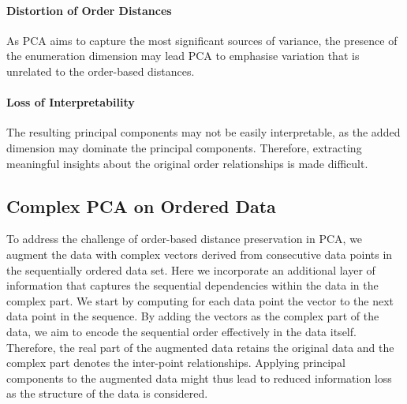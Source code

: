 \documentclass[pdftex,12pt,a4paper]{report}
\begin{document}
\paragraph{Distortion of Order Distances}
As PCA aims to capture the most significant sources of variance, the presence of the enumeration dimension may lead PCA to emphasise variation that is unrelated to the order-based distances.
\paragraph{Loss of Interpretability}
The resulting principal components may not be easily interpretable, as the added dimension may dominate the principal components.
Therefore, extracting meaningful insights about the original order relationships is made difficult.


\subsection{Complex PCA on Ordered Data} \label{CPCA}
To address the challenge of order-based distance preservation in PCA, we augment the data with complex vectors derived from consecutive data points in the sequentially ordered data set.
Here we incorporate an additional layer of information that captures the sequential dependencies within the data in the complex part.
We start by computing for each data point the vector to the next data point in the sequence.
By adding the vectors as the complex part of the data, we aim to encode the sequential order effectively in the data itself.
Therefore, the real part of the augmented data retains the original data and the complex part denotes the inter-point relationships.
Applying principal components to the augmented data might thus lead to reduced information loss as the structure of the data is considered.
\end{document}
